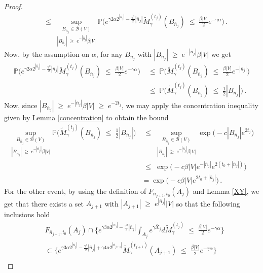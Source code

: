 \documentclass[11pt]{article}
\numberwithin{equation}{section}
\theoremstyle{definition}
\renewcommand{\tilde}{\widetilde}          %
\renewcommand{\leq}{\;\leqslant\;}                   %
\renewcommand{\geq}{\;\geqslant\;}                   %
\renewcommand{\P}{\mathbb{P}}
\newcommand{\ab}{|}
\newcommand{\Pb}{\P}
\begin{document}
\begin{proof}
\begin{align*}
& \leq \underset{\ab B_{\bar n_j} \ab \geq e^{- \ab \bar n_j \ab } \beta \ab V \ab  }{\sup_{B_{\bar n_j} \in \mathcal{B}(V)}} \Pb \big( e^{\gamma 2 \alpha 2^{| \bar n_{j} | }  - \frac{\gamma^2}{2} |\bar n_{j}| }  \tilde M_\gamma^{(t_{j})}(B_{\bar n_j}) \leq \tfrac{\beta \ab V \ab }{2} e^{-\gamma \alpha} \big)\,.
\end{align*}
Now, by the assumption on $\alpha$, for any $B_{\bar n_j}$ with $\ab B_{\bar n_j} \ab \geq e^{- \ab \bar n_j \ab } \beta \ab V \ab$ we get 
\begin{align*}
\Pb \big( e^{\gamma 2 \alpha 2^{| \bar n_{j} | }  - \frac{\gamma^2}{2} |\bar n_{j}| }  \tilde M_\gamma^{(t_{j})}(B_{\bar n_j}) \leq \tfrac{\beta \ab V \ab }{2} e^{-\gamma \alpha} \big) & \leq \Pb \big( \tilde M_\gamma^{(t_j)}(B_{\bar n_j}) \leq \tfrac{\beta \ab V \ab }{2} e^{-|\bar n_j|} \big) \\
& \leq \Pb \big( \tilde M_\gamma^{(t_j)}(B_{\bar n_j}) \leq \tfrac 12 |B_{\bar n_j}| \big)\,.
\end{align*}
Now, since $|B_{\bar n_j}| \geq e^{-|\bar n_j|} \beta |V|  \geq e^{-2 t_j}$, we may apply the concentration inequality given by Lemma \ref{concentration} to obtain the bound
\begin{align*}
\underset{\ab B_{\bar n_j} \ab \geq e^{- \ab \bar n_j \ab } \beta \ab V \ab  }{\sup_{B_{\bar n_j} \in \mathcal{B}(V)}} \Pb \big( \tilde M_\gamma^{(t_j)}(B_{\bar n_j}) \leq \tfrac 12 |B_{\bar n_j}| \big) & \leq \underset{\ab B_{\bar n_j} \ab \geq e^{- \ab \bar n_j \ab } \beta \ab V \ab  }{\sup_{B_{\bar n_j} \in \mathcal{B}(V)}} \exp \big( -c   |B_{\bar n_j}| e^{2 t_j}  \big) \\
& \leq \exp \big( -c \beta \ab V \ab e^{- \ab \bar n_j \ab } e^{2 (t_0+ \ab \bar n_j \ab )}  \big) \\
&= \exp \big( -c \beta \ab V \ab  e^{2t_0 + \ab \bar n_j \ab }  \big)\,.
\end{align*}
For the other event, by using the definition of $F_{\bar n_{j+1}, t_0}(A_j)$ and Lemma \ref{XY}, we get that there exists a set $A_{j+1}$ with $|A_{j+1}|\geq e^{|\bar n_j|}|V|$ so that the following inclusions hold 
\begin{align*}
& F_{\bar n_{j+1}, t_0}(A_j) \cap \{ e^{\gamma 3 \alpha 2^{| \bar n_{j} | }  - \frac{\gamma^2}{2} |\bar n_{j}| } \int_{A_{j}} e^{\gamma \bar X_{j}} d \tilde M_\gamma^{(t_{j})} \leq \tfrac{\beta \ab V \ab }{2} e^{-\gamma \alpha} \}  \\
& \subset \big\{ e^{\gamma 3 \alpha 2^{| \bar n_{j} | }  - \frac{\gamma^2}{2} |\bar n_{j}| + \gamma 4\alpha 2^{|\bar n_{j+1}|} } \tilde M_\gamma^{(t_{j+1})}(A_{j+1}) \leq \tfrac{\beta \ab V \ab }{2} e^{-\gamma \alpha} \big\} \\

\end{align*}
\end{proof}
\end{document}
